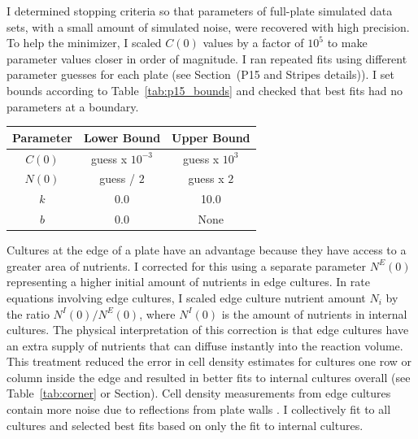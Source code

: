 I determined stopping criteria so that parameters of full-plate
simulated data sets, with a small amount of simulated noise, were
recovered with high precision. To help the minimizer, I scaled
\(C(0)\) values by a factor of \(10^{5}\) to make parameter
values closer in order of magnitude. I ran repeated fits using
different parameter guesses for each plate (see Section~(P15 and
Stripes details)). I set bounds according to
Table~\ref{tab:p15_bounds} and checked that best fits had no
parameters at a boundary.
%
\columnbreak
\begin{center}
  \begin{tabular}{| c | c c |}
    \hline
    Parameter        & Lower Bound  & Upper Bound \\
    \hline
    \(C(0)\)     & guess x \(10^{-3}\)  & guess x \(10^{3}\)\\
    \(N(0)\)     & guess / \(2\)  & guess x \(2\)\\
    \(k\)        & 0.0    & 10.0\\
    \(b\)           & 0.0    & None \\
    \hline
  \end{tabular}
  \label{tab:p15_bounds}
\end{center}
%
Cultures at the edge of a plate have an advantage because they have
access to a greater area of nutrients. I corrected for this using a
separate parameter \(N^{E}(0)\) representing a higher initial
amount of nutrients in edge cultures. In rate equations involving edge
cultures, I scaled edge culture nutrient amount \(N_{i}\) by the ratio
\(N^{I}(0)/N^{E}(0)\), where \(N^{I}(0)\) is the amount
of nutrients in internal cultures. The physical interpretation of this
correction is that edge cultures have an extra supply of nutrients
that can diffuse instantly into the reaction volume. This treatment
reduced the error in cell density estimates for cultures one row or
column inside the edge and resulted in better fits to internal
cultures overall (see Table~\ref{tab:corner} or Section). Cell density
measurements from edge cultures contain more noise due to reflections
from plate walls \citep{Lawless2010}. I collectively fit to all
cultures and selected best fits based on only the fit to internal
cultures.

